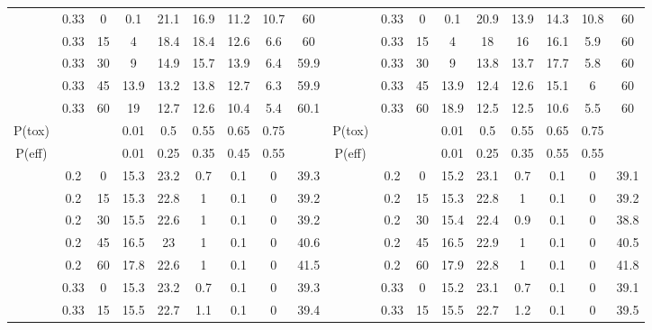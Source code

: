 \begin{table}
{\begin{tabular}[t]{cccccccc>{}c|ccccccccc}
			& 0.33 & 0 & 0.1 & 21.1 & 16.9 & 11.2 & 10.7 & 60 &  & 0.33 & 0 & 0.1 & 20.9 & 13.9 & 14.3 & 10.8 & 60\\
			
			& 0.33 & 15 & 4 & 18.4 & 18.4 & 12.6 & 6.6 & 60 &  & 0.33 & 15 & 4 & 18 & 16 & 16.1 & 5.9 & 60\\
			
			& 0.33 & 30 & 9 & 14.9 & 15.7 & 13.9 & 6.4 & 59.9 &  & 0.33 & 30 & 9 & 13.8 & 13.7 & 17.7 & 5.8 & 60\\
			
			& 0.33 & 45 & 13.9 & 13.2 & 13.8 & 12.7 & 6.3 & 59.9 &  & 0.33 & 45 & 13.9 & 12.4 & 12.6 & 15.1 & 6 & 60\\
			
			\multirow{-10}{*}{\centering\arraybackslash 1} & 0.33 & 60 & 19 & 12.7 & 12.6 & 10.4 & 5.4 & 60.1 & \multirow{-10}{*}{\centering\arraybackslash 7} & 0.33 & 60 & 18.9 & 12.5 & 12.5 & 10.6 & 5.5 & 60\\
			\cmidrule{1-18}
			P(tox) &  &  & 0.01 & 0.5 & 0.55 & 0.65 & 0.75 &  & P(tox) &  &  & 0.01 & 0.5 & 0.55 & 0.65 & 0.75 \vphantom{2} & \\
			\cmidrule{1-18}
			P(eff) &  &  & 0.01 & 0.25 & 0.35 & 0.45 & 0.55 &  & P(eff) &  &  & 0.01 & 0.25 & 0.35 & 0.55 & 0.55 & \\
			\cmidrule{1-18}
			& 0.2 & 0 & 15.3 & 23.2 & 0.7 & 0.1 & 0 & 39.3 &  & 0.2 & 0 & 15.2 & 23.1 & 0.7 & 0.1 & 0 & 39.1\\
			
			& 0.2 & 15 & 15.3 & 22.8 & 1 & 0.1 & 0 & 39.2 &  & 0.2 & 15 & 15.3 & 22.8 & 1 & 0.1 & 0 & 39.2\\
			
			& 0.2 & 30 & 15.5 & 22.6 & 1 & 0.1 & 0 & 39.2 &  & 0.2 & 30 & 15.4 & 22.4 & 0.9 & 0.1 & 0 & 38.8\\
			
			& 0.2 & 45 & 16.5 & 23 & 1 & 0.1 & 0 & 40.6 &  & 0.2 & 45 & 16.5 & 22.9 & 1 & 0.1 & 0 & 40.5\\
			
			& 0.2 & 60 & 17.8 & 22.6 & 1 & 0.1 & 0 & 41.5 &  & 0.2 & 60 & 17.9 & 22.8 & 1 & 0.1 & 0 & 41.8\\
			
			& 0.33 & 0 & 15.3 & 23.2 & 0.7 & 0.1 & 0 & 39.3 &  & 0.33 & 0 & 15.2 & 23.1 & 0.7 & 0.1 & 0 & 39.1\\
			
			& 0.33 & 15 & 15.5 & 22.7 & 1.1 & 0.1 & 0 & 39.4 &  & 0.33 & 15 & 15.5 & 22.7 & 1.2 & 0.1 & 0 & 39.5\\
			

\end{tabular}}
\end{table}
